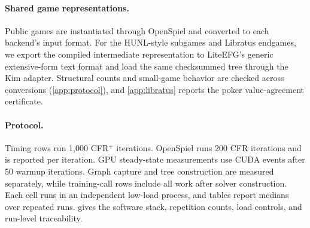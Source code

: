 \paragraph{Shared game representations.}
Public games are instantiated through OpenSpiel and converted to each backend's input
format. For the HUNL-style subgames and Libratus endgames, we export the compiled
intermediate representation to LiteEFG's generic extensive-form text format and load
the same checksummed tree through the Kim adapter. Structural counts and small-game behavior are checked across conversions
(\cref{app:protocol}), and \cref{app:libratus} reports the poker value-agreement
certificate.

\paragraph{Protocol.}
Timing rows run 1{,}000 CFR$^{+}$ iterations. OpenSpiel runs 200 CFR iterations and
is reported per iteration. GPU steady-state measurements use CUDA events \cite{guide2020cuda} after 50
warmup iterations. Graph capture and tree construction are measured separately, while
training-call rows include all work after solver construction. Each cell runs in an
independent low-load process, and tables report
medians over repeated runs.  gives the software
stack, repetition counts, load controls, and run-level traceability.
